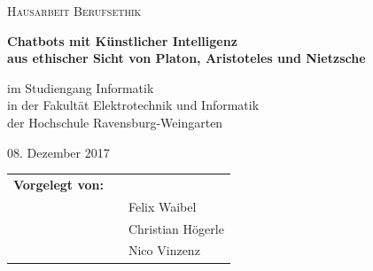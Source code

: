 \begin{figure}[ht]
	\hfill
\end{figure}

\begin{center}
	\textsc{\Large{Hausarbeit Berufsethik\\[1.5cm]}}
\end{center}

\begin{center}
	\LARGE{\textbf{	
			Chatbots mit Künstlicher Intelligenz \\
			aus ethischer Sicht von Platon, Aristoteles und Nietzsche \\[2.0cm]
	}}
\end{center}

\begin{center}
	\small{im Studiengang Informatik}\\
	\small{in der Fakultät Elektrotechnik und Informatik}\\
	\small{der Hochschule Ravensburg-Weingarten}\\[2.0cm]
\end{center}

\begin{center}
	\large{08. Dezember 2017\\[2.0cm]}
\end{center}

\begin{center}
	\begin{tabular}{lll}
		\textbf{Vorgelegt von:}\\
		 & & Felix Waibel\\
		&& Christian Högerle\\
		&& Nico Vinzenz
	\end{tabular}
\end{center}